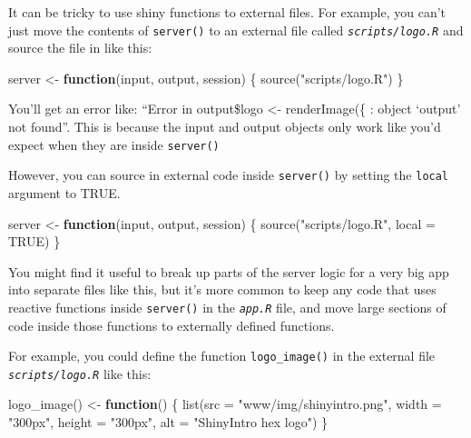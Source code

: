 \documentclass[
  oneside]{book}
\newenvironment{Shaded}{\begin{snugshade}}{\end{snugshade}}
\newcommand{\AttributeTok}[1]{\textcolor[rgb]{0.77,0.63,0.00}{#1}}
\newcommand{\ConstantTok}[1]{\textcolor[rgb]{0.00,0.00,0.00}{#1}}
\newcommand{\ControlFlowTok}[1]{\textcolor[rgb]{0.13,0.29,0.53}{\textbf{#1}}}
\newcommand{\FunctionTok}[1]{\textcolor[rgb]{0.00,0.00,0.00}{#1}}
\newcommand{\NormalTok}[1]{#1}
\newcommand{\OtherTok}[1]{\textcolor[rgb]{0.56,0.35,0.01}{#1}}
\newcommand{\StringTok}[1]{\textcolor[rgb]{0.31,0.60,0.02}{#1}}
\begin{document}
It can be tricky to use shiny functions to external files. For example, you can't just move the contents of \texttt{server}\texttt{()} to an external file called \textit{\texttt{scripts/logo.R}} and source the file in like this:

\begin{Shaded}
\begin{Highlighting}[]
\NormalTok{server }\OtherTok{\textless{}{-}} \ControlFlowTok{function}\NormalTok{(input, output, session) \{}
    \FunctionTok{source}\NormalTok{(}\StringTok{"scripts/logo.R"}\NormalTok{)}
\NormalTok{\} }
\end{Highlighting}
\end{Shaded}

You'll get an error like: ``Error in output\$logo \textless- renderImage(\{ : object `output' not found''. This is because the input and output objects only work like you'd expect when they are inside \texttt{server}\texttt{()}

However, you can source in external code inside \texttt{server}\texttt{()} by setting the \texttt{local} argument to TRUE.

\begin{Shaded}
\begin{Highlighting}[]
\NormalTok{server }\OtherTok{\textless{}{-}} \ControlFlowTok{function}\NormalTok{(input, output, session) \{}
    \FunctionTok{source}\NormalTok{(}\StringTok{"scripts/logo.R"}\NormalTok{, }\AttributeTok{local =} \ConstantTok{TRUE}\NormalTok{)}
\NormalTok{\} }
\end{Highlighting}
\end{Shaded}

You might find it useful to break up parts of the server logic for a very big app into separate files like this, but it's more common to keep any code that uses reactive functions inside \texttt{server}\texttt{()} in the \textit{\texttt{app.R}} file, and move large sections of code inside those functions to externally defined functions.

For example, you could define the function \texttt{logo\_image}\texttt{()} in the external file \textit{\texttt{scripts/logo.R}} like this:

\begin{Shaded}
\begin{Highlighting}[]
\FunctionTok{logo\_image}\NormalTok{() }\OtherTok{\textless{}{-}} \ControlFlowTok{function}\NormalTok{() \{}
  \FunctionTok{list}\NormalTok{(}\AttributeTok{src =} \StringTok{"www/img/shinyintro.png"}\NormalTok{,}
       \AttributeTok{width =} \StringTok{"300px"}\NormalTok{,}
       \AttributeTok{height =} \StringTok{"300px"}\NormalTok{,}
       \AttributeTok{alt =} \StringTok{"ShinyIntro hex logo"}\NormalTok{)}
\NormalTok{\}}
\end{Highlighting}
\end{Shaded}
\end{document}
